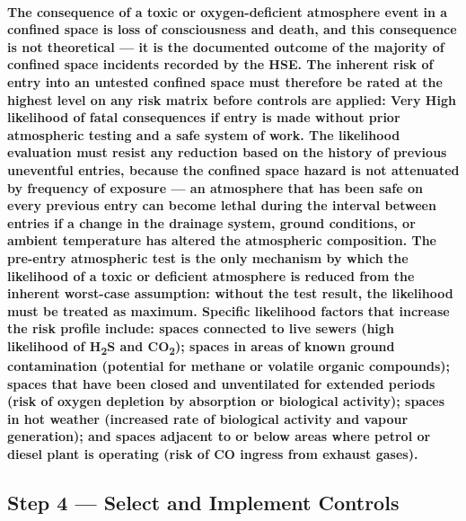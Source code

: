 \paragraph{The consequence of a toxic or oxygen-deficient atmosphere event in a confined space is loss of consciousness and death, and this consequence is not theoretical --- it is the documented outcome of the majority of confined space incidents recorded by the HSE. The inherent risk of entry into an untested confined space must therefore be rated at the highest level on any risk matrix before controls are applied: Very High likelihood of fatal consequences if entry is made without prior atmospheric testing and a safe system of work. The likelihood evaluation must resist any reduction based on the history of previous uneventful entries, because the confined space hazard is not attenuated by frequency of exposure --- an atmosphere that has been safe on every previous entry can become lethal during the interval between entries if a change in the drainage system, ground conditions, or ambient temperature has altered the atmospheric composition. The pre-entry atmospheric test is the only mechanism by which the likelihood of a toxic or deficient atmosphere is reduced from the inherent worst-case assumption: without the test result, the likelihood must be treated as maximum. Specific likelihood factors that increase the risk profile include: spaces connected to live sewers (high likelihood of H\textsubscript{2}S and CO\textsubscript{2}); spaces in areas of known ground contamination (potential for methane or volatile organic compounds); spaces that have been closed and unventilated for extended periods (risk of oxygen depletion by absorption or biological activity); spaces in hot weather (increased rate of biological activity and vapour generation); and spaces adjacent to or below areas where petrol or diesel plant is operating (risk of CO ingress from exhaust gases).}

\subsection{Step 4 --- Select and Implement Controls}
